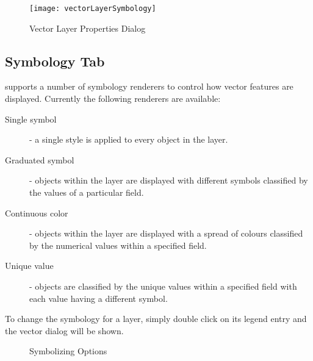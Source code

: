 \begin{figure}[ht]
   \centering
   \texttt{[image: vectorLayerSymbology]} 
   \caption{Vector Layer Properties Dialog \nixcaption}\label{fig:vector_symbology}   
 \end{figure}

\subsection{Symbology Tab}\label{sec:symbology}

\qg supports a number of symbology renderers to control how
vector features are displayed. Currently the following renderers
are available:

\begin{description} 
    \item[Single symbol] - a single style is applied to every
    object in the layer.
    \item[Graduated symbol] - objects within the layer are
    displayed with different symbols classified by the values of a
    particular field.
    \item[Continuous color] - objects within the layer are
    displayed with a spread of colours classified by the numerical
    values within a specified field.
    \item[Unique value] - objects are classified by the unique
    values within a specified field with each value having a
    different symbol.
\end{description}

To change the symbology for a layer, simply double click on its legend 
entry and the vector  dialog will be 
shown.

\begin{figure}[ht]
\centering
\caption{Symbolizing Options \nixcaption}
   \hspace{1cm}
   \hspace{1cm}
   \hspace{1cm}
\end{figure}


